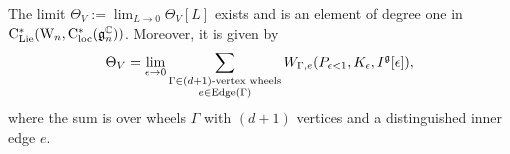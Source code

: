 \documentclass[10pt]{amsart}
\begin{document}
\begin{lem}\label{lem: g anomaly}
The limit $\Theta_{V} := \lim_{L \to 0} \Theta_{V}[L]$ exists and 
is an element of degree one in ${\rm C}_{{\rm Lie}}^*({{\rm W}_n},{\rm C}_{\rm loc}^*(\mathfrak g_n^\mathbb C))$. 
Moreover, it is given by
\[
\Theta_V = \lim_{\epsilon \to 0} \sum_{\substack{\Gamma \in (d+1)\text{\rm -vertex wheels}\\ e \in {\rm Edge}(\Gamma)}} W_{\Gamma,e}(P_{\epsilon<1}, K_\epsilon,
I^{\rm \mathfrak g}[\epsilon]),
\]
where the sum is over wheels $\Gamma$ with $(d+1)$ vertices and a distinguished inner edge $e$.
\end{lem}



\end{document}
